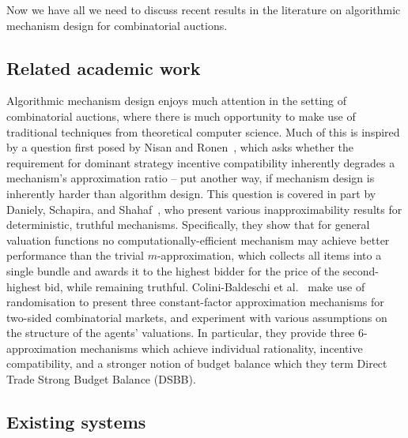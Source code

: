\documentclass[10pt,a4paper]{article}
\theoremstyle{plain}
\theoremstyle{definition}
\begin{document}
	Now we have all we need to discuss recent results in the literature on
	algorithmic mechanism design for combinatorial auctions.

	\subsection{Related academic work}

	Algorithmic mechanism design enjoys much attention in the setting of
	combinatorial auctions, where there is much opportunity to make use of
	traditional techniques from theoretical computer science. Much of this is
	inspired by a question first posed by Nisan and Ronen~\cite{Nisan2001},
	which asks whether the requirement for dominant strategy incentive
	compatibility inherently degrades a mechanism's approximation ratio -- put
	another way, if mechanism design is inherently harder than algorithm
	design. This question is covered in part by Daniely, Schapira, and
	Shahaf~\cite{Daniely2018}, who present various inapproximability results
	for deterministic, truthful mechanisms. Specifically, they show that for
	general valuation functions no computationally-efficient mechanism may
	achieve better performance than the trivial $m$-approximation, which
	collects all items into a single bundle and awards it to the highest bidder
	for the price of the second-highest bid, while remaining truthful.
	Colini-Baldeschi et al.~\cite{ColiniBaldeschi2017} make use of
	randomisation to present three constant-factor approximation mechanisms for
	two-sided combinatorial markets, and experiment with various assumptions on
	the structure of the agents' valuations. In particular, they provide three
	6-approximation mechanisms which achieve individual rationality, incentive
	compatibility, and a stronger notion of budget balance which they term
	Direct Trade Strong Budget Balance (DSBB).


	\subsection{Existing systems}
\end{document}
